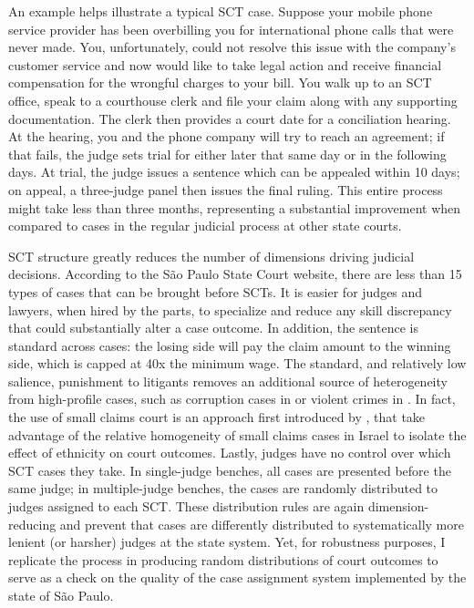 \documentclass[11pt]{article}
\begin{document}
An example helps illustrate a typical SCT case. Suppose your mobile phone service provider has been overbilling you for international phone calls that were never made. You, unfortunately, could not resolve this issue with the company's customer service and now would like to take legal action and receive financial compensation for the wrongful charges to your bill. You walk up to an SCT office, speak to a courthouse clerk and file your claim along with any supporting documentation. The clerk then provides a court date for a conciliation hearing. At the hearing, you and the phone company will try to reach an agreement; if that fails, the judge sets trial for either later that same day or in the following days. At trial, the judge issues a sentence which can be appealed within 10 days; on appeal, a three-judge panel then issues the final ruling. This entire process might take less than three months, representing a substantial improvement when compared to cases in the regular judicial process at other state courts.

SCT structure greatly reduces the number of dimensions driving judicial decisions. According to the São Paulo State Court website, there are less than 15 types of cases that can be brought before SCTs. It is easier for judges and lawyers, when hired by the parts, to specialize and reduce any skill discrepancy that could substantially alter a case outcome. In addition, the sentence is standard across cases: the losing side will pay the claim amount to the winning side, which is capped at 40x the minimum wage. The standard, and relatively low salience, punishment to litigants removes an additional source of heterogeneity from high-profile cases, such as corruption cases in \citet{LambaisJudicialSubversionEvidence2018} or violent crimes in \citet{LimJudgePoliticianPress2015}. In fact, the use of small claims court is an approach first introduced by \citet{ShayoJudicialIngroupBias2011}, that take advantage of the relative homogeneity of small claims cases in Israel to isolate the effect of ethnicity on court outcomes. Lastly, judges have no control over which SCT cases they take. In single-judge benches, all cases are presented before the same judge; in multiple-judge benches, the cases are randomly distributed to judges assigned to each SCT. These distribution rules are again dimension-reducing and prevent that cases are differently distributed to systematically more lenient (or harsher) judges at the state system. Yet, for robustness purposes, I replicate the process in \citet{AbramsJudgesVaryTheir2012} producing random distributions of court outcomes to serve as a check on the quality of the case assignment system implemented by the state of São Paulo.
\end{document}
